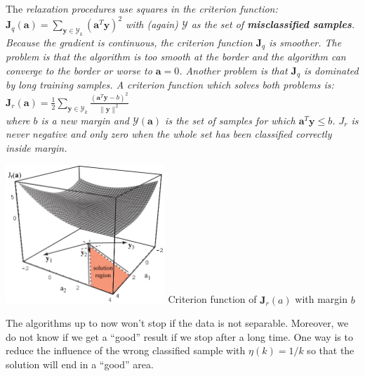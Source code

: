     \begin{minipage}{12cm}
    The \em relaxation procedures \em use squares in the criterion function:\\
	$\bm J_q(\bm a) = \sum\limits_{\bm y \in \mathcal{Y}_k} (\bm a^T \bm y)^2$ with (again) $\mathcal{Y}$ as the set
    of \textbf{misclassified samples}.\\
  	Because the gradient is continuous, the criterion function $\bm J_q$ is smoother. The problem is that the algorithm is too smooth at the border and 
  	the algorithm can converge to the border or worse to $\bm a=0$. 
  	Another problem is that $\bm J_q$ is dominated by long training samples. A criterion function which solves both problems is:\\
  	$\bm J_r(\bm a) = \frac{1}{2} \sum\limits_{\bm y \in \mathcal{Y}_k} \frac{(\bm a^T \bm y - b)^2}{\|\bm y\|^2}$\\
  	where $b$ is a new margin and $\mathcal{Y}(\bm a)$ is the set of samples for which $\bm a^T \bm y \leq b$. $J_r$ is never 
  	negative and only zero when the whole set has been classified correctly inside margin.
	   
    \end{minipage}
    \hspace{8mm}
    \begin{minipage}{6.4cm}
    	 \includegraphics[width=6cm]{./images/relaxation.png}
    	 Criterion function of $\bm J_r(a)$ with margin $b$
    \end{minipage}
    
    The algorithms up to now won't stop if the data is not separable. Moreover, we do not know if we get a ``good'' result if we stop after a long time.
    One way is to reduce the influence of the wrong classified sample with $\eta(k)=1/k$ so that the solution will end in a ``good'' area.
    
